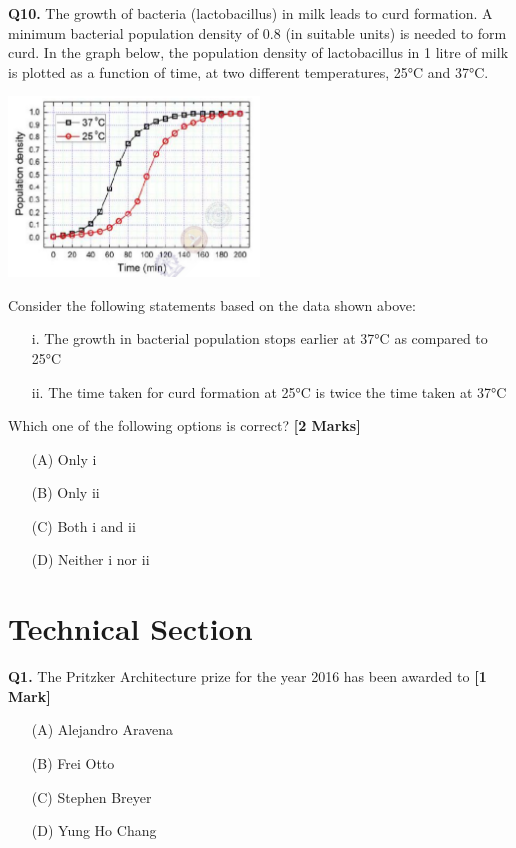 \documentclass[11pt]{article}
\newcommand{\questiona}[2]{
    \noindent\textbf{Q#2.} #1 \hfill \textbf{[1 Mark]}
}
\newcommand{\questionb}[2]{
    \noindent\textbf{Q#2.} #1 \hfill \textbf{[2 Marks]}
}
\begin{document}
\vspace{0.5cm}

\questionb{The growth of bacteria (lactobacillus) in milk leads to curd formation. A minimum bacterial population density of 0.8 (in suitable units) is needed to form curd. In the graph below, the population density of lactobacillus in 1 litre of milk is plotted as a function of time, at two different temperatures, 25°C and 37°C.

\begin{center}
\includegraphics[width=0.5\textwidth]{figures/10.png}
\end{center}

Consider the following statements based on the data shown above:
\begin{enumerate}
\item[i.] The growth in bacterial population stops earlier at 37°C as compared to 25°C  
\item[ii.] The time taken for curd formation at 25°C is twice the time taken at 37°C
\end{enumerate}

Which one of the following options is correct?}{10}
\begin{enumerate}
    \item[(A)] Only i
    \item[(B)] Only ii  
    \item[(C)] Both i and ii
    \item[(D)] Neither i nor ii
\end{enumerate}

\vspace{0.5cm}

\vspace{0.5 cm}

\section*{Technical Section}

\questiona{The Pritzker Architecture prize for the year 2016 has been awarded to}{1}
\begin{enumerate}
    \item[(A)] Alejandro Aravena
    \item[(B)] Frei Otto  
    \item[(C)] Stephen Breyer
    \item[(D)] Yung Ho Chang
\end{enumerate}
\end{document}
